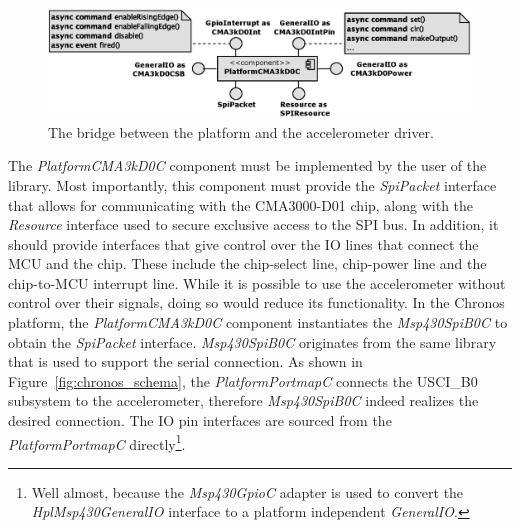 \begin{figure}[h]
  \centering
  \includegraphics[width=1.0\textwidth]{diagrams/platform_cma3kd0_c.eps}
  \caption{The bridge between the platform and the accelerometer driver.}
  \label{fig:platform_cma3kd0_c}
\end{figure}
The \emph{PlatformCMA3kD0C} component must be implemented by the user of the library. Most importantly, this component must provide the \emph{SpiPacket} interface that allows for communicating with the CMA3000-D01 chip, along with the \emph{Resource} interface used to secure exclusive access to the SPI bus. In addition, it should provide interfaces that give control over the IO lines that connect the MCU and the chip. These include the chip-select line, chip-power line and the chip-to-MCU interrupt line. While it is possible to use the accelerometer without control over their signals, doing so would reduce its functionality. In the Chronos platform, the \emph{PlatformCMA3kD0C} component instantiates the \emph{Msp430SpiB0C} to obtain the \emph{SpiPacket} interface. \emph{Msp430SpiB0C} originates from the same library that is used to support the serial connection. As shown in Figure~\ref{fig:chronos_schema}, the \emph{PlatformPortmapC} connects the USCI\_B0 subsystem to the accelerometer, therefore \emph{Msp430SpiB0C} indeed realizes the desired connection. The IO pin interfaces are sourced from the \emph{PlatformPortmapC} directly\footnote{Well almost, because the \emph{Msp430GpioC} adapter is used to convert the \emph{HplMsp430GeneralIO} interface to a platform independent \emph{GeneralIO}.}.

